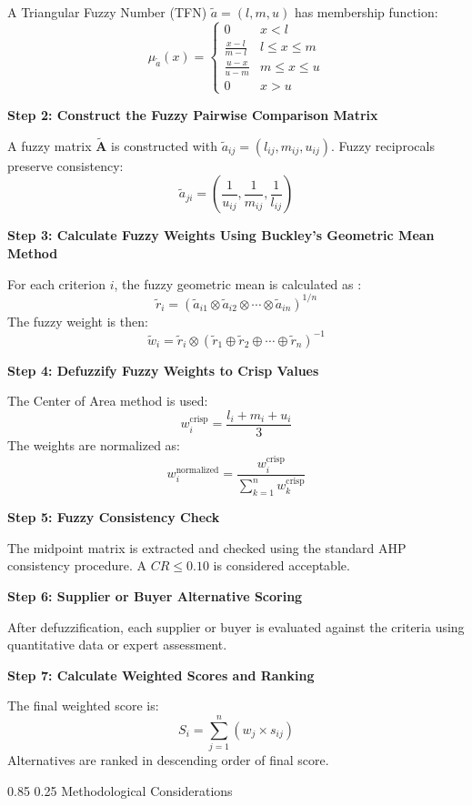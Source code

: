 \documentclass[11pt]{article}
\makeatletter
\renewcommand\paragraph{\@startsection{paragraph}{4}{\z@}%
  {0.85\baselineskip}%
  {0.25\baselineskip}%
  {\normalfont\normalsize\bfseries}}
\newcommand{\stepheading}[1]{%
\par\vspace{0.75\baselineskip}%
\noindent\textbf{#1}\par
\vspace{0.25\baselineskip}%
}
\makeatother
\begin{document}
A Triangular Fuzzy Number (TFN) $\tilde{a}=(l,m,u)$ has membership function:
\[
\mu_{\tilde{a}}(x)=
\begin{cases}
0 & x<l \\
\frac{x-l}{m-l} & l\leq x\leq m \\
\frac{u-x}{u-m} & m\leq x\leq u \\
0 & x>u
\end{cases}
\]

\stepheading{Step 2: Construct the Fuzzy Pairwise Comparison Matrix}

A fuzzy matrix $\tilde{\mathbf{A}}$ is constructed with $\tilde{a}_{ij}=(l_{ij},m_{ij},u_{ij})$. Fuzzy reciprocals preserve consistency:
\[
\tilde{a}_{ji}=\left(\frac{1}{u_{ij}},\frac{1}{m_{ij}},\frac{1}{l_{ij}}\right)
\]

\stepheading{Step 3: Calculate Fuzzy Weights Using Buckley's Geometric Mean Method}

For each criterion $i$, the fuzzy geometric mean is calculated as \cite{ref80}:
\[
\tilde{r}_i=(\tilde{a}_{i1}\otimes\tilde{a}_{i2}\otimes\cdots\otimes\tilde{a}_{in})^{1/n}
\]
The fuzzy weight is then:
\[
\tilde{w}_i=\tilde{r}_i\otimes(\tilde{r}_1\oplus\tilde{r}_2\oplus\cdots\oplus\tilde{r}_n)^{-1}
\]

\stepheading{Step 4: Defuzzify Fuzzy Weights to Crisp Values}

The Center of Area method is used:
\[
w_i^{\text{crisp}}=\frac{l_i+m_i+u_i}{3}
\]
The weights are normalized as:
\[
w_i^{\text{normalized}}=\frac{w_i^{\text{crisp}}}{\sum_{k=1}^{n}w_k^{\text{crisp}}}
\]

\stepheading{Step 5: Fuzzy Consistency Check}

The midpoint matrix is extracted and checked using the standard AHP consistency procedure. A $CR\leq0.10$ is considered acceptable.

\stepheading{Step 6: Supplier or Buyer Alternative Scoring}

After defuzzification, each supplier or buyer is evaluated against the criteria using quantitative data or expert assessment.

\stepheading{Step 7: Calculate Weighted Scores and Ranking}

The final weighted score is:
\[
S_i=\sum_{j=1}^{n}(w_j\times s_{ij})
\]
Alternatives are ranked in descending order of final score.

\paragraph{Methodological Considerations}
\end{document}
